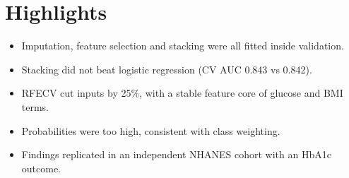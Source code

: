\documentclass[12pt]{article}
\begin{document}
\section*{Highlights}
\begin{itemize}
  \item Imputation, feature selection and stacking were all fitted inside validation.
  \item Stacking did not beat logistic regression (CV AUC 0.843 vs 0.842).
  \item RFECV cut inputs by 25\%, with a stable feature core of glucose and BMI terms.
  \item Probabilities were too high, consistent with class weighting.
  \item Findings replicated in an independent NHANES cohort with an HbA1c outcome.
\end{itemize}
\end{document}
